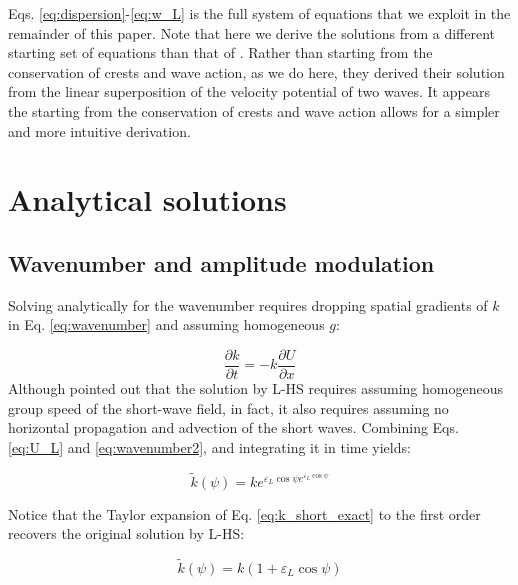 \documentclass[draft]{agujournal2019}
\begin{document}
Eqs. \ref{eq:dispersion}-\ref{eq:w_L} is the full system of equations that we
exploit in the remainder of this paper.
Note that here we derive the solutions from a different starting set of
equations than that of .
Rather than starting from the conservation of crests and wave action, as we do
here, they derived their solution from the linear superposition of the velocity
potential of two waves.
It appears the starting from the conservation of crests and wave action allows
for a simpler and more intuitive derivation.

\section{Analytical solutions}
\label{section:analytical_solutions}

\subsection{Wavenumber and amplitude modulation}
\label{subsection:analytical_solutions}

Solving analytically for the wavenumber requires dropping spatial gradients of
$k$ in Eq. \ref{eq:wavenumber} and assuming homogeneous $g$:

\begin{equation}
\label{eq:wavenumber2}
\dfrac{\partial k}{\partial t}
= - k \dfrac{\partial U}{\partial x}
\end{equation}
Although  pointed out that the solution by L-HS
requires assuming homogeneous group speed of the short-wave field, in fact,
it also requires assuming no horizontal propagation and advection of the short
waves.
Combining Eqs. \ref{eq:U_L} and \ref{eq:wavenumber2}, and integrating it in time
yields:

\begin{equation}
\label{eq:k_short_exact}
\widetilde{k}(\psi) = k e^{\varepsilon_L \cos{\psi} e^{\varepsilon_L \cos{\psi}}}
\end{equation}

Notice that the Taylor expansion of Eq. \ref{eq:k_short_exact} to the first order
recovers the original solution by L-HS:

\begin{equation}
\label{eq:k_short_lhs}
\widetilde{k}(\psi) = k (1 + \varepsilon_L \cos{\psi})
\end{equation}
\end{document}
